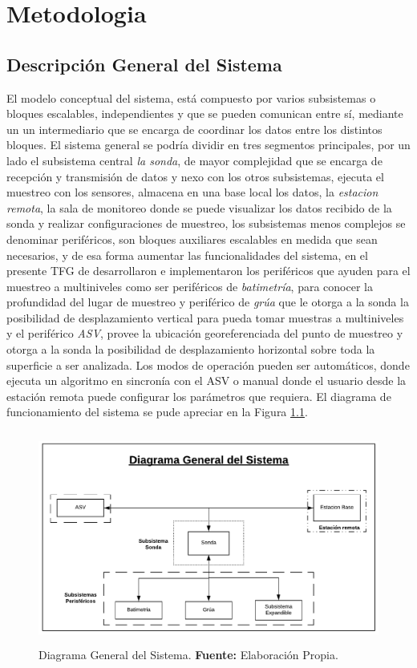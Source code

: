 \chapter[Capítulo 3. Metodolog\'ia.]{Metodologia}
\pagestyle


\section[Descripción General del Sistema]{Descripción General del Sistema}

El modelo conceptual del sistema, está compuesto por varios subsistemas o bloques escalables, independientes y que se pueden comunican entre s\'i, mediante un un intermediario que se encarga de coordinar los datos entre los distintos bloques. El sistema general se podr\'ia dividir en tres segmentos principales, por un lado el subsistema central \textit{la sonda}, de mayor complejidad que se encarga de recepci\'on y transmisi\'on de datos y nexo con los otros subsistemas, ejecuta el muestreo con los sensores, almacena en una base local los datos, la \textit{estacion remota}, la sala de monitoreo donde se puede visualizar los datos recibido de la sonda y realizar configuraciones de muestreo, los subsistemas menos complejos se denominar perif\'ericos, son bloques auxiliares escalables en medida que sean necesarios, y de esa forma aumentar las funcionalidades del sistema, en el presente TFG de desarrollaron e implementaron los perif\'ericos que ayuden para el muestreo a multiniveles como ser perif\'ericos de \textit{batimetr\'ia}, para conocer la profundidad del lugar de muestreo y perif\'erico de \textit{gr\'ua} que le otorga a la sonda la posibilidad de desplazamiento vertical para pueda tomar muestras a multiniveles y el perif\'erico \textit{ASV}, provee la ubicaci\'on georeferenciada del punto de muestreo y otorga a la sonda la posibilidad de desplazamiento horizontal sobre toda la superficie a ser analizada. Los modos de operaci\'on pueden ser autom\'aticos, donde ejecuta un algoritmo en sincron\'ia con el ASV o manual donde el usuario desde la estaci\'on remota puede configurar los par\'ametros que requiera.  
El diagrama de funcionamiento del sistema se pude apreciar en la Figura \ref{fig:3.1}.


\begin{figure}[H]
    \centering
    \includegraphics[width=150mm, height=70mm]{Imagenes/2021/img31.pdf}
    \caption[Diagrama General del Sistema]{Diagrama General del Sistema. \textbf{Fuente:} Elaboración Propia.}
    \label{fig:3.1}
\end{figure}




